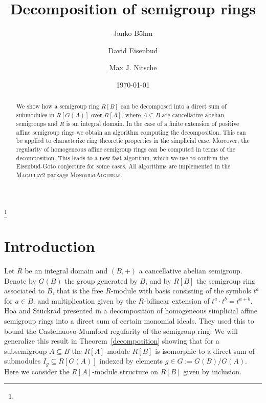 \documentclass[11pt,a4paper]{amsart}%
\theoremstyle{definition}
\theoremstyle{remark}
\numberwithin{equation}{section}
\theoremstyle{plain}
\begin{document}
\title[Decomposition of semigroup rings]{Decomposition of semigroup rings}
\author{Janko B\"{o}hm}
\address{Department of Mathematics, Universit\"{a}t des Saarlandes, Campus E2 4 \\
D-66123 Saarbr\"{u}cken, Germany}
\author{David Eisenbud}
\address{Dept of Mathematics, University of California, Berkeley, CA 94720, USA}
\author{Max J. Nitsche}
\address{Max-Planck-Institute for Mathematics in the Sciences, Inselstrasse 22, 04103
Leipzig, Germany}
\thanks{}
\date{\today}



\begin{abstract}

We show how a semigroup ring $R[B]$ can be decomposed into a direct sum of submodules in $R[G(A)]$ over $R[A]$, where $A\subseteq B$ are cancellative abelian semigroups and $R$ is an integral domain. In the case of a finite extension of positive affine semigroup rings we obtain an algorithm computing the decomposition. This can be applied to characterize ring theoretic properties in the simplicial case. Moreover, the regularity of homogeneous affine semigroup rings can be computed in terms of the decomposition. This leads to a new fast algorithm, which we use to confirm the Eisenbud-Goto conjecture for some cases. All algorithms are implemented in the \textsc{Macaulay2} package \textsc{MonomialAlgebras}.

\end{abstract}
\maketitle


\section{Introduction}


Let $R$ be an integral domain and $(B,+)$ a cancellative abelian semigroup. Denote by $G(B)$ the group generated by $B$, and by $R[B]$ the semigroup ring associated to $B$, that is the free $R$-module with basis consisting of the symbols $t^a$ for $a\in B$, and multiplication given by the $R$-bilinear extension of $t^a\cdot t^b=t^{a+b}$. Hoa and St\"uckrad presented in \cite{HSCM} a decomposition of homogeneous simplicial affine semigroup rings into a direct sum of certain monomial ideals. They used this to bound the Castelnuovo-Mumford regularity of the semigroup ring. We will generalize this result in Theorem~\ref{decomposition} showing that for a subsemigroup $A\subseteq B$ the $R[A]$-module $R[B]$ is isomorphic to a direct sum of submodules $I_{g}\subseteq R[G(A)]$ indexed by elements $g\in G:= G(B)/G(A)$. Here we consider the $R[A]$-module structure on $R[B]$ given by inclusion.\\
\end{document}
